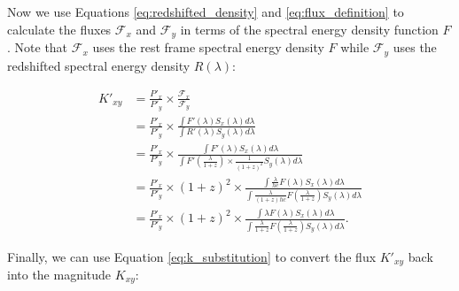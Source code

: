 \documentclass[linenumbers]{aastex631}
\begin{document}
Now we use Equations \ref{eq:redshifted_density} and \ref{eq:flux_definition}
to calculate the fluxes $\mathcal{F}_x$ and $\mathcal{F}_y$ in terms of the
spectral energy density function $F$. Note that $\mathcal{F}_x$ uses the rest
frame spectral energy density $F$ while $\mathcal{F}_y$ uses the redshifted
spectral energy density $R(\lambda)$:

\begin{equation}
\begin{aligned}
  K'_{xy} &= \frac{P'_x}{P'_y} \times \frac{\mathcal{F}_x}{\mathcal{F}_y} \\
         &= \frac{P'_x}{P'_y} \times
              \frac{\int F'(\lambda) S_x(\lambda) d\lambda}
                   {\int R'(\lambda) S_y(\lambda) d\lambda} \\
         &= \frac{P'_x}{P'_y} \times
              \frac{\int F'(\lambda) S_x(\lambda) d\lambda}
                   {\int F'(\frac{\lambda}{1+z}) \times \frac{1}{(1 + z)^2} S_y(\lambda) d\lambda} \\
         &= \frac{P'_x}{P'_y} \times (1+z)^2 \times
              \frac{\int \frac{\lambda}{hc} F(\lambda) S_x(\lambda) d\lambda}
                   {\int \frac{\lambda}{(1+z)hc} F\left(\frac{\lambda}{1+z}\right) S_y(\lambda) d\lambda} \\
         &= \frac{P'_x}{P'_y} \times (1 + z)^2 \times
              \frac{\int \lambda F(\lambda) S_x(\lambda) d\lambda}
                   {\int \frac{\lambda}{1+z} F\left(\frac{\lambda}{1+z}\right) S_y(\lambda) d\lambda} .
\end{aligned}
\end{equation}

Finally, we can use Equation \ref{eq:k_substitution} to convert the flux $K'_{xy}$ back
into the magnitude $K_{xy}$:
\end{document}
